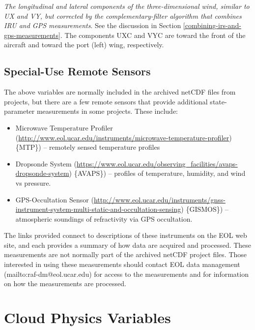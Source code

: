 \documentclass[
]{book}
\providecommand{\tightlist}{%
  \setlength{\itemsep}{0pt}\setlength{\parskip}{0pt}}
\begin{document}
\emph{The longitudinal and lateral components of the three-dimensional wind, similar to UX and VY, but corrected by the complementary-filter algorithm that combines IRU and GPS measurements}. See the discussion in Section \ref{combining-irs-and-gps-measurements}. The components UXC and VYC are toward the front of the aircraft and toward the port (left) wing, respectively.

\hypertarget{special-use-remote}{%
\section{Special-Use Remote Sensors}\label{special-use-remote}}

The above variables are normally included in the archived netCDF files from projects, but there are a few remote sensors that provide additional state-parameter measurements in some projects. These include:\protect\hypertarget{subsec:MTP}{}{}

\begin{itemize}
\tightlist
\item
  Microwave Temperature Profiler (\url{http://www.eol.ucar.edu/instruments/microwave-temperature-profiler}) \{MTP\})
  -- remotely sensed temperature profiles\\
\item
  Dropsonde System (\url{https://www.eol.ucar.edu/observing_facilities/avaps-dropsonde-system}) \{AVAPS\})
  -- profiles of temperature, humidity, and wind vs pressure.\\
\item
  GPS-Occultation Sensor (\url{http://www.eol.ucar.edu/instruments/gnss-instrument-system-multi-static-and-occultation-sensing}) \{GISMOS\})
  -- atmospheric soundings of refractivity via GPS occultation.
\end{itemize}

The links provided connect to descriptions of these instruments on the EOL web site, and each provides a summary of how data are acquired and processed. These measurements are not normally part of the archived netCDF project files. Those interested in using these measurements should contact EOL data management (mailto:raf-dm@eol.ucar.edu) for access to the measurements and for information on how the measurements are processed.

\hypertarget{cloud-physics-variables}{%
\chapter{Cloud Physics Variables}\label{cloud-physics-variables}}
\end{document}
